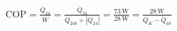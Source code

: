 \( \text{COP} = \frac{\dot{Q}_{24}}{\dot{W}} = \frac{\dot{Q}_{24}}{\dot{Q}_{2ab} + |\dot{Q}_{24}|} = \frac{73 \, \text{W}}{28 \, \text{W}} = \frac{28 \, \text{W}}{\dot{Q}_K - \dot{Q}_{ab}} \)